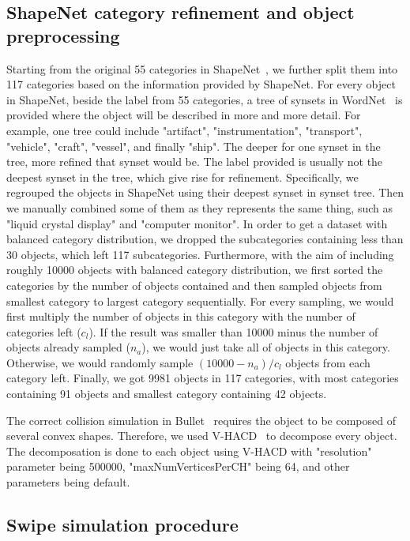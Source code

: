 \subsection{ShapeNet category refinement and object preprocessing}

Starting from the original 55 categories in ShapeNet~\cite{Chang2015}, we further split them into 117 categories based on the information provided by ShapeNet.
For every object in ShapeNet, beside the label from 55 categories, a tree of synsets in WordNet~\cite{miller1995wordnet} is provided where the object will be described in more and more detail. 
For example, one tree could include "artifact", "instrumentation", "transport", "vehicle", "craft", "vessel", and finally "ship". 
The deeper for one synset in the tree, more refined that synset would be. 
The label provided is usually not the deepest synset in the tree, which give rise for refinement. 
Specifically, we regrouped the objects in ShapeNet using their deepest synset in synset tree.
Then we manually combined some of them as they represents the same thing, such as "liquid crystal display" and "computer monitor".
In order to get a dataset with balanced category distribution, we dropped the subcategories containing less than 30 objects, which left 117 subcategories. 
Furthermore, with the aim of including roughly 10000 objects with balanced category distribution, we first sorted the categories by the number of objects contained and then sampled objects from smallest category to largest category sequentially. 
For every sampling, we would first multiply the number of objects in this category with the number of categories left ($c_l$). 
If the result was smaller than 10000 minus the number of objects already sampled ($n_a$), we would just take all of objects in this category.
Otherwise, we would randomly sample $(10000 - n_a)/c_l$ objects from each category left.
Finally, we got 9981 objects in 117 categories, with most categories containing 91 objects and smallest category containing 42 objects.

The correct collision simulation in Bullet~\cite{wiki:bullet} requires the object to be composed of several convex shapes.
Therefore, we used V-HACD~\cite{mamou2009simple} to decompose every object.
The decomposation is done to each object using V-HACD with "resolution" parameter being 500000, "maxNumVerticesPerCH" being 64, and other parameters being default.

\subsection{Swipe simulation procedure}

